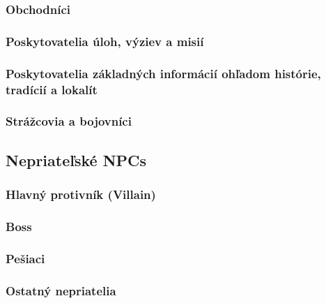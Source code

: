 \documentclass[10pt,twoside,slovak,a4paper]{article}
\begin{document}
\subsubsection{Obchodníci}
\subsubsection{Poskytovatelia úloh, výziev a misií}
\subsubsection{Poskytovatelia základných informácií ohľadom histórie, tradícií a lokalít}


\subsubsection{Strážcovia a bojovníci} \label{services}

\subsection{Nepriateľské NPCs} \label{enemy}

\subsubsection{Hlavný protivník (Villain)} \label{BOSS}

\subsubsection{Boss} \label{BOSS}

\subsubsection{Pešiaci} \label{Pesiaci}

\subsubsection{Ostatný nepriatelia} \label{Pesiaci}
\end{document}
